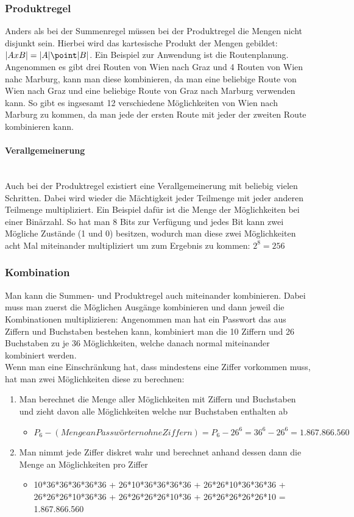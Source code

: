 \documentclass{article}
\newcommand{\paragraphlb}[1]{\paragraph{#1}\mbox{}\\}
\begin{document}
	\subsubsection{Produktregel}
	Anders als bei der Summenregel müssen bei der Produktregel die Mengen nicht disjunkt sein. Hierbei wird das kartesische Produkt der Mengen gebildet: $|AxB|=|A|\point|B|$. Ein Beispiel zur Anwendung ist die Routenplanung. Angenommen es gibt drei Routen von Wien nach Graz und 4 Routen von Wien nahc Marburg, kann man diese kombinieren, da man eine beliebige Route von Wien nach Graz und eine beliebige Route von Graz nach Marburg verwenden kann. So gibt es ingsesamt 12 verschiedene Möglichkeiten von Wien nach Marburg zu kommen, da man jede der ersten Route mit jeder der zweiten Route kombinieren kann.
	\paragraphlb{Verallgemeinerung}
	Auch bei der Produktregel existiert eine Verallgemeinerung mit beliebig vielen Schritten. Dabei wird wieder die Mächtigkeit jeder Teilmenge mit jeder anderen Teilmenge multipliziert. Ein Beispiel dafür ist die Menge der Möglichkeiten bei einer Binärzahl. So hat man 8 Bits zur Verfügung und jedes Bit kann zwei Mögliche Zustände (1 und 0) besitzen, wodurch man diese zwei Möglichkeiten acht Mal miteinander multipliziert um zum Ergebnis zu kommen: $2^8=256$
	\subsubsection{Kombination}
	Man kann die Summen- und Produktregel auch miteinander kombinieren. Dabei muss man zuerst die Möglichen Ausgänge kombinieren und dann jeweil die Kombinationen multiplizieren: Angenommen man hat ein Passwort das aus Ziffern und Buchstaben bestehen kann, kombiniert man die 10 Ziffern und 26 Buchstaben zu je 36 Möglichkeiten, welche danach normal miteinander kombiniert werden. \\
	Wenn man eine Einschränkung hat, dass mindestens eine Ziffer vorkommen muss, hat man zwei Möglichkeiten diese zu berechnen:
	\begin{enumerate}
		\item{Man berechnet die Menge aller Möglichkeiten mit Ziffern und Buchstaben und zieht davon alle Möglichkeiten welche nur Buchstaben enthalten ab}
		\begin{itemize}
			\item{$P_6 - (Menge an Passwörtern ohne Ziffern) = P_6 - 26^6 = 36^6 - 26^6 = 1.867.866.560$}
		\end{itemize}
		\item{Man nimmt jede Ziffer diskret wahr und berechnet anhand dessen dann die Menge an Möglichkeiten pro Ziffer}
		\begin{itemize}
			\item{10*36*36*36*36*36 + 26*10*36*36*36*36 + 26*26*10*36*36*36 + 26*26*26*10*36*36 + 26*26*26*26*10*36 + 26*26*26*26*26*10 = 1.867.866.560}
		\end{itemize}
	\end{enumerate}
\end{document}

